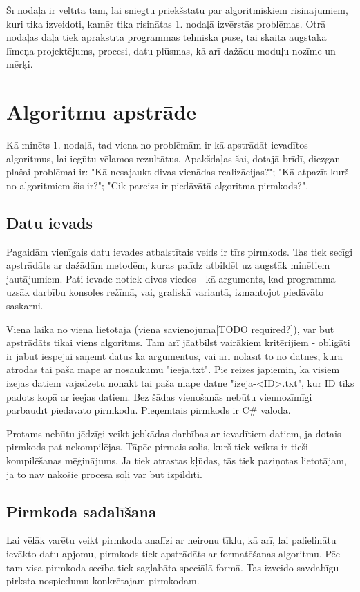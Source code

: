 Šī nodaļa ir veltīta tam, lai sniegtu priekšstatu par algoritmiskiem risinājumiem, kuri tika izveidoti, kamēr tika  risinātas 1. nodaļā izvērstās problēmas. Otrā nodaļas daļā tiek aprakstīta programmas tehniskā puse, tai skaitā augstāka līmeņa projektējums, procesi, datu plūsmas, kā arī dažādu moduļu nozīme un mērķi.

\section{Algoritmu apstrāde}
Kā minēts 1. nodaļā, tad viena no problēmām ir kā apstrādāt ievadītos algoritmus, lai iegūtu vēlamos rezultātus. Apakšdaļas šai, dotajā brīdī, diezgan plašai problēmai ir: "Kā nesajaukt divas vienādas realizācijas?"; "Kā atpazīt kurš no algoritmiem šis ir?"; "Cik pareizs ir piedāvātā algoritma pirmkods?". 

\subsection{Datu ievads}
Pagaidām vienīgais datu ievades atbalstītais veids ir tīrs pirmkods. Tas tiek secīgi apstrādāts ar dažādām metodēm, kuras palīdz atbildēt uz augstāk minētiem jautājumiem. Pati ievade notiek divos viedos - kā arguments, kad programma uzsāk darbību konsoles režīmā, vai, grafiskā variantā, izmantojot piedāvāto saskarni.

Vienā laikā no viena lietotāja (viena savienojuma[TODO required?]), var būt apstrādāts tikai viens algoritms. Tam arī jāatbilst vairākiem kritērijiem - obligāti ir jābūt iespējai saņemt datus kā argumentus, vai arī nolasīt to no datnes, kura atrodas tai pašā mapē ar nosaukumu "ieeja.txt". Pie reizes jāpiemin, ka visiem izejas datiem vajadzētu nonākt tai pašā mapē datnē "izeja-<ID>.txt", kur ID tiks padots kopā ar ieejas datiem. Bez šādas vienošanās nebūtu viennozīmīgi pārbaudīt piedāvāto pirmkodu. Pieņemtais pirmkods ir C\# valodā.

Protams nebūtu jēdzīgi veikt jebkādas darbības ar ievadītiem datiem, ja dotais pirmkods pat nekompilējas. Tāpēc pirmais solis, kurš tiek veikts ir tieši kompilēšanas mēģinājums. Ja tiek atrastas kļūdas, tās tiek paziņotas lietotājam, ja to nav nākošie procesa soļi var būt izpildīti.

\subsection{Pirmkoda sadalīšana}
Lai vēlāk varētu veikt pirmkoda analīzi ar neironu tīklu, kā arī, lai palielinātu ievākto datu apjomu, pirmkods tiek apstrādāts ar formatēšanas algoritmu. Pēc tam visa pirmkoda secība tiek saglabāta speciālā formā. Tas izveido savdabīgu pirksta nospiedumu konkrētajam pirmkodam.

